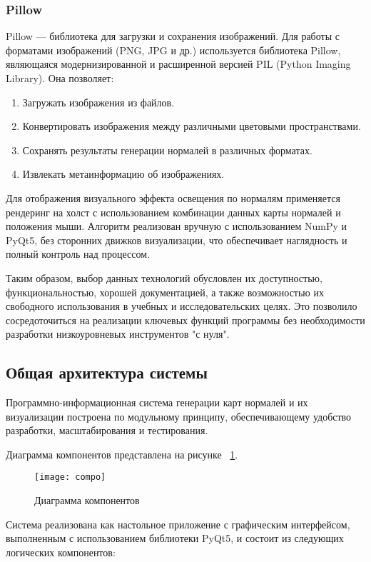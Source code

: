 \subsubsection{Pillow}

Pillow — библиотека для загрузки и сохранения изображений. Для работы с форматами изображений (PNG, JPG и др.) используется библиотека Pillow, являющаяся модернизированной и расширенной версией PIL (Python Imaging Library). Она позволяет:
\begin{enumerate}
	\item Загружать изображения из файлов.
	\item Конвертировать изображения между различными цветовыми пространствами.
	\item Сохранять результаты генерации нормалей в различных форматах.
	\item Извлекать метаинформацию об изображениях.
\end{enumerate}

Для отображения визуального эффекта освещения по нормалям применяется рендеринг на холст с использованием комбинации данных карты нормалей и положения мыши. Алгоритм реализован вручную с использованием NumPy и PyQt5, без сторонних движков визуализации, что обеспечивает наглядность и полный контроль над процессом.

Таким образом, выбор данных технологий обусловлен их доступностью, функциональностью, хорошей документацией, а также возможностью их свободного использования в учебных и исследовательских целях. Это позволило сосредоточиться на реализации ключевых функций программы без необходимости разработки низкоуровневых инструментов "с нуля".
\subsection{Общая архитектура системы}

Программно-информационная система генерации карт нормалей и их визуализации построена по модульному принципу, обеспечивающему удобство разработки, масштабирования и тестирования. 

Диаграмма компонентов представлена на рисунке ~\ref{compo:image}.

\begin{figure}[ht]
	\texttt{[image: compo]}
	\caption{Диаграмма компонентов}
	\label{compo:image}
\end{figure}

Система реализована как настольное приложение с графическим интерфейсом, выполненным с использованием библиотеки PyQt5, и состоит из следующих логических компонентов:

